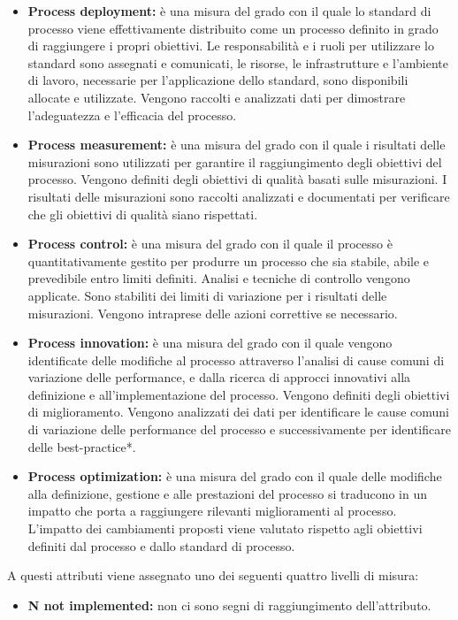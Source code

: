 \documentclass[11pt,a4paper]{article}
\begin{document}
{\begin{itemize}
	\item \textbf{Process deployment:} è una misura del grado con il quale lo standard di processo viene effettivamente distribuito come un processo definito in grado di raggiungere i propri obiettivi. Le responsabilità e i ruoli per utilizzare lo standard sono assegnati e comunicati, le risorse, le infrastrutture e l'ambiente di lavoro, necessarie per l'applicazione dello standard, sono disponibili allocate e utilizzate. Vengono raccolti e analizzati dati per dimostrare l'adeguatezza e l'efficacia del processo.
	\item \textbf{Process measurement:} è una misura del grado con il quale i risultati delle misurazioni sono utilizzati per garantire il raggiungimento degli obiettivi del processo. Vengono definiti degli obiettivi di qualità basati sulle misurazioni. I risultati delle misurazioni sono raccolti analizzati e documentati per verificare che gli obiettivi di qualità siano rispettati.
	\item \textbf{Process control:} è una misura del grado con il quale il processo è quantitativamente gestito per produrre un processo che sia stabile, abile e prevedibile entro limiti definiti. Analisi e tecniche di controllo vengono applicate. Sono stabiliti dei limiti di variazione per i risultati delle misurazioni. Vengono intraprese delle azioni correttive se necessario. 
	\item \textbf{Process innovation:} è una misura del grado con il quale vengono identificate delle modifiche al processo attraverso l'analisi di cause comuni di variazione delle performance, e dalla ricerca di approcci innovativi alla definizione e all'implementazione del processo. Vengono definiti degli obiettivi di miglioramento. Vengono analizzati dei dati per identificare le cause comuni di variazione delle performance del processo e successivamente per identificare delle best-practice*.
	\item \textbf{Process optimization:} è una misura del grado con il quale delle modifiche alla definizione, gestione e alle prestazioni del processo si traducono in un impatto che porta a raggiungere rilevanti miglioramenti al processo. L'impatto dei cambiamenti proposti viene valutato rispetto agli obiettivi definiti dal processo e dallo standard di processo.
\end{itemize}
A questi attributi viene assegnato uno dei seguenti quattro livelli di misura:
\begin{itemize}
	\item \textbf{N not implemented:} non ci sono segni di raggiungimento dell'attributo.

\end{itemize}}
\end{document}
